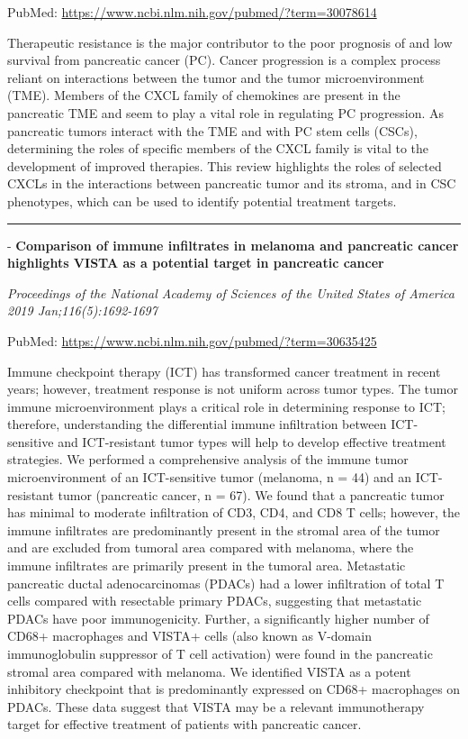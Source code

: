 \documentclass[]{article}
\begin{document}
PubMed: \url{https://www.ncbi.nlm.nih.gov/pubmed/?term=30078614}

Therapeutic resistance is the major contributor to the poor prognosis of
and low survival from pancreatic cancer (PC). Cancer progression is a
complex process reliant on interactions between the tumor and the tumor
microenvironment (TME). Members of the CXCL family of chemokines are
present in the pancreatic TME and seem to play a vital role in
regulating PC progression. As pancreatic tumors interact with the TME
and with PC stem cells (CSCs), determining the roles of specific members
of the CXCL family is vital to the development of improved therapies.
This review highlights the roles of selected CXCLs in the interactions
between pancreatic tumor and its stroma, and in CSC phenotypes, which
can be used to identify potential treatment targets.

{}

{}

\begin{center}\rule{0.5\linewidth}{\linethickness}\end{center}

 - \textbf{Comparison of immune infiltrates in melanoma and pancreatic
cancer highlights VISTA as a potential target in pancreatic cancer}

\emph{Proceedings of the National Academy of Sciences of the United
States of America 2019 Jan;116(5):1692-1697}

PubMed: \url{https://www.ncbi.nlm.nih.gov/pubmed/?term=30635425}

Immune checkpoint therapy (ICT) has transformed cancer treatment in
recent years; however, treatment response is not uniform across tumor
types. The tumor immune microenvironment plays a critical role in
determining response to ICT; therefore, understanding the differential
immune infiltration between ICT-sensitive and ICT-resistant tumor types
will help to develop effective treatment strategies. We performed a
comprehensive analysis of the immune tumor microenvironment of an
ICT-sensitive tumor (melanoma, n = 44) and an ICT-resistant tumor
(pancreatic cancer, n = 67). We found that a pancreatic tumor has
minimal to moderate infiltration of CD3, CD4, and CD8 T cells; however,
the immune infiltrates are predominantly present in the stromal area of
the tumor and are excluded from tumoral area compared with melanoma,
where the immune infiltrates are primarily present in the tumoral area.
Metastatic pancreatic ductal adenocarcinomas (PDACs) had a lower
infiltration of total T cells compared with resectable primary PDACs,
suggesting that metastatic PDACs have poor immunogenicity. Further, a
significantly higher number of CD68+ macrophages and VISTA+ cells (also
known as V-domain immunoglobulin suppressor of T cell activation) were
found in the pancreatic stromal area compared with melanoma. We
identified VISTA as a potent inhibitory checkpoint that is predominantly
expressed on CD68+ macrophages on PDACs. These data suggest that VISTA
may be a relevant immunotherapy target for effective treatment of
patients with pancreatic cancer.
\end{document}
